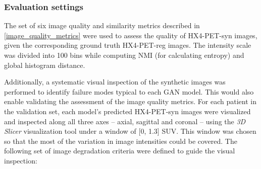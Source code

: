 \subsubsection{Evaluation settings}
The set of six image quality and similarity metrics described in \ref{image_quality_metrics} were used to assess the quality of HX4-PET-syn images, given the corresponding ground truth HX4-PET-reg images. The intensity scale was divided into 100 bins while computing NMI (for calculating entropy) and global histogram distance.

Additionally, a systematic visual inspection of the synthetic images was performed to identify failure modes typical to each GAN model. This would also enable validating the assessment of the image quality metrics. For each patient in the validation set, each model's predicted HX4-PET-syn images were visualized and inspected along all three axes -- axial, sagittal and coronal -- using the \textit{3D Slicer} visualization tool under a window of [0, 1.3] SUV. This window was chosen so that the most of the variation in image intensities could be covered. The following set of image degradation criteria were defined to guide the visual inspection:

